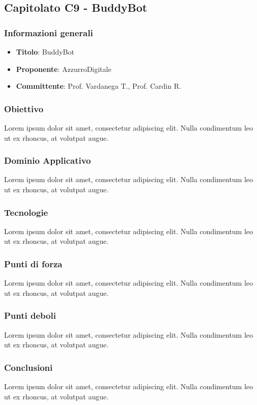 \subsection{Capitolato C9 - BuddyBot}
     \subsubsection{Informazioni generali}
        \begin{itemize}
            \item \textbf{Titolo}: BuddyBot
            \item \textbf{Proponente}: AzzurroDigitale
            \item \textbf{Committente}: Prof. Vardanega T., Prof. Cardin R.
        \end{itemize}
    \subsubsection{Obiettivo}
    Lorem ipsum dolor sit amet, consectetur adipiscing elit. Nulla condimentum leo ut ex rhoncus, at volutpat augue.
     \subsubsection{Dominio Applicativo}
    Lorem ipsum dolor sit amet, consectetur adipiscing elit. Nulla condimentum leo ut ex rhoncus, at volutpat augue.
    \subsubsection{Tecnologie}
    Lorem ipsum dolor sit amet, consectetur adipiscing elit. Nulla condimentum leo ut ex rhoncus, at volutpat augue.
    \subsubsection{Punti di forza}
    Lorem ipsum dolor sit amet, consectetur adipiscing elit. Nulla condimentum leo ut ex rhoncus, at volutpat augue.
    \subsubsection{Punti deboli}
    Lorem ipsum dolor sit amet, consectetur adipiscing elit. Nulla condimentum leo ut ex rhoncus, at volutpat augue.
    \subsubsection{Conclusioni}
    Lorem ipsum dolor sit amet, consectetur adipiscing elit. Nulla condimentum leo ut ex rhoncus, at volutpat augue.